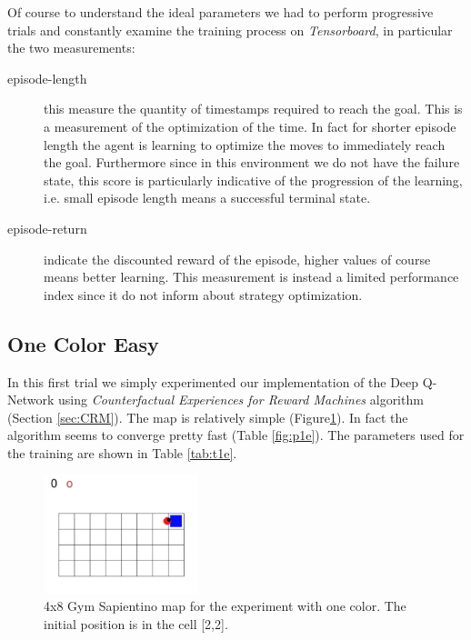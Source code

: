 \documentclass{article}
\begin{document}
Of course to understand the ideal parameters we had to perform progressive trials and constantly examine the training process on \textit{Tensorboard}, in particular the two measurements:
\begin{description}
\item[episode-length] this measure the quantity of timestamps required to reach the goal. This is a measurement of the optimization of the time. In fact for shorter episode length the agent is learning to optimize the moves to immediately reach the goal. Furthermore since in this environment we do not have the failure state, this score is particularly indicative of the progression of the learning, i.e. small episode length means a successful terminal state.
\item[episode-return] indicate the discounted reward of the episode, higher values of course means better learning. This measurement is instead a limited performance index since it do not inform about strategy optimization.
\end{description}




\subsection{One Color Easy} %

In this first trial we simply experimented our implementation of the Deep Q-Network using \textit{Counterfactual Experiences for Reward Machines} algorithm (Section \ref{sec:CRM}). The map is relatively simple (Figure\ref{fig:m1e}). In fact the algorithm seems to converge pretty fast (Table \ref{fig:p1e}). The parameters used for the training are shown in Table \ref{tab:t1e}.
\begin{figure}[ht]
    \centering
    \includegraphics[width = 0.4\textwidth]{images/map1_easy.png}
    \caption{4x8 Gym Sapientino map for the experiment with one color. The initial position is in the cell [2,2].}
    \label{fig:m1e}
\end{figure}
\end{document}
